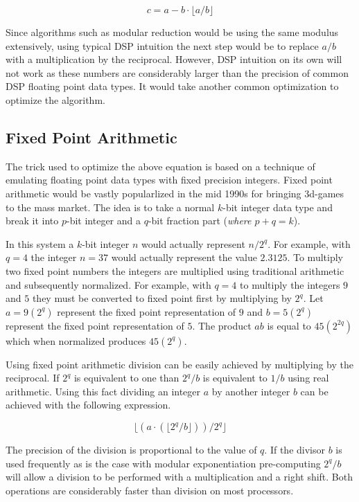 \documentclass[b5paper]{book}
\begin{document}
\begin{equation}
c = a - b \cdot \lfloor a/b \rfloor
\end{equation}

Since algorithms such as modular reduction would be using the same modulus extensively, using typical DSP intuition the next step would be to 
replace $a/b$ with a multiplication by the reciprocal.  However, DSP intuition on its own will not work as these numbers are considerably
larger than the precision of common DSP floating point data types.  It would take another common optimization to optimize the algorithm.

\subsection{Fixed Point Arithmetic}
The trick used to optimize the above equation is based on a technique of emulating floating point data types with fixed precision integers.  Fixed
point arithmetic would be vastly popularlized in the mid 1990s for bringing 3d-games to the mass market.  The idea is to take a normal $k$-bit 
integer data type and break it into $p$-bit integer and a $q$-bit fraction part (\textit{where $p+q = k$}).  

In this system a $k$-bit integer $n$ would actually represent $n/2^q$.  For example, with $q = 4$ the integer $n = 37$ would actually represent the
value $2.3125$.  To multiply two fixed point numbers the integers are multiplied using traditional arithmetic and subsequently normalized. For example, 
with $q = 4$ to multiply the integers $9$ and $5$ they must be converted to fixed point first by multiplying by $2^q$.  Let $a = 9(2^q)$ 
represent the fixed point representation of $9$ and $b = 5(2^q)$ represent the fixed point representation of $5$.  The product $ab$ is equal to
$45(2^{2q})$ which when normalized produces $45(2^q)$.  

Using fixed point arithmetic division can be easily achieved by multiplying by the reciprocal.  If $2^q$ is equivalent to one than $2^q/b$ is 
equivalent to $1/b$ using real arithmetic.  Using this fact dividing an integer $a$ by another integer $b$ can be achieved with the following
expression.

\begin{equation}
\lfloor (a \cdot (\lfloor 2^q / b \rfloor))/2^q \rfloor
\end{equation}

The precision of the division is proportional to the value of $q$.  If the divisor $b$ is used frequently as is the case with 
modular exponentiation pre-computing $2^q/b$ will allow a division to be performed with a multiplication and a right shift.  Both operations
are considerably faster than division on most processors.  
\end{document}
